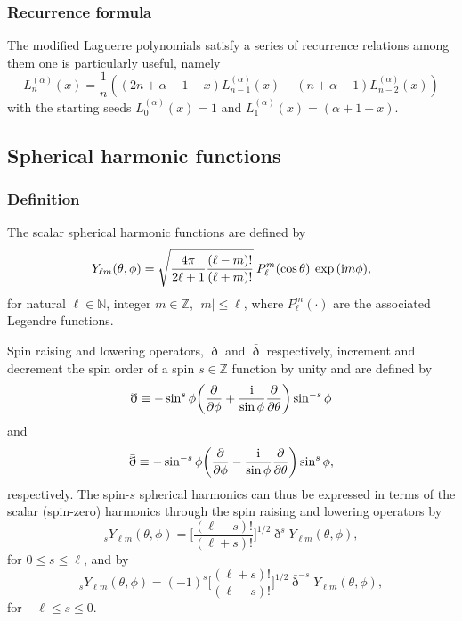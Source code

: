\documentclass[a4paper,11pt]{article}
\newcommand{\naturals}{\ensuremath{{\mathbb{N}}}}
\newcommand{\integers}{\ensuremath{{\mathbb{Z}}}}
\newcommand{\im}{{\rm i}}
\newcommand{\spinup}{\ensuremath{\eth}}
\newcommand{\spindown}{\ensuremath{\bar{\eth}}}
\begin{document}
\subsubsection{Recurrence formula}
The modified Laguerre polynomials satisfy a series of recurrence relations among them one is particularly useful, namely
\begin{equation}
L^{(\alpha)}_n(x) = \frac{1}{n}\left( (2n + \alpha -1 -x)L^{(\alpha)}_{n-1}(x) - (n +  \alpha -1)L^{(\alpha)}_{n-2}(x) \right)
\label{eq-laguerre-recu}
\end{equation}
with the starting seeds $L^{(\alpha)}_0(x)= 1$ and $L^{(\alpha)}_1(x)=(\alpha+1-x)$.
%
\subsection{Spherical harmonic functions}
%
\subsubsection{Definition}
%
The scalar spherical harmonic functions are defined by
\begin{equation}
  Y_{\ell m}(\theta, \phi) = 
  \sqrt{\frac{4\pi}{2\ell+1} \frac{(\ell-m)!}{(\ell+m)!}} \:
  P_\ell^m(\cos\theta) \:
  \exp{(\im m \phi)}
  ,
\end{equation}
for natural $\ell \in \naturals$, integer $m \in \integers$, $\vert m \vert \leq \ell$, where $P_\ell^m(\cdot)$ are the associated Legendre functions.

Spin raising and lowering operators, $\spinup$ and $\spindown$ respectively, increment and decrement the spin order of a spin $s \in \integers$ function by unity and are defined by
\begin{equation}  
  \spinup \equiv
  -\sin^s \phi 
  \biggl ( 
  \frac{\partial}{\partial \phi} 
  + \frac{\im}{\sin\phi} \frac{\partial}{\partial \theta}
  \biggr)
  \sin^{-s}\phi
\end{equation}
and
\begin{equation}  
  \spindown \equiv 
  -\sin^{-s} \phi 
  \biggl ( 
  \frac{\partial}{\partial \phi} 
  - \frac{\im}{\sin\phi} \frac{\partial}{\partial \theta}
  \biggr)
  \sin^{s}\phi
  ,
\end{equation}
respectively.  
%
The spin-$s$ spherical harmonics can thus be expressed in terms of
the scalar (spin-zero) harmonics through the spin raising and lowering
operators by 
\begin{equation}    
  {}_s Y_{\ell m}(\theta,\phi)
  =
  \biggl[ \frac{(\ell-s)!}{(\ell+s)!} \biggr]^{1/2} 
  \spinup^s
  Y_{\ell m}(\theta,\phi)
  ,
\end{equation}
for $0 \leq s \leq \ell$,
and by 
\begin{equation}    
  {}_s Y_{\ell m}(\theta,\phi)
  =
  (-1)^s
  \biggl[ \frac{(\ell+s)!}{(\ell-s)!} \biggr]^{1/2} 
  \spindown^{-s}
  Y_{\ell m}(\theta,\phi)  
  ,
\end{equation}
for $-\ell \leq s \leq 0$.
\end{document}
